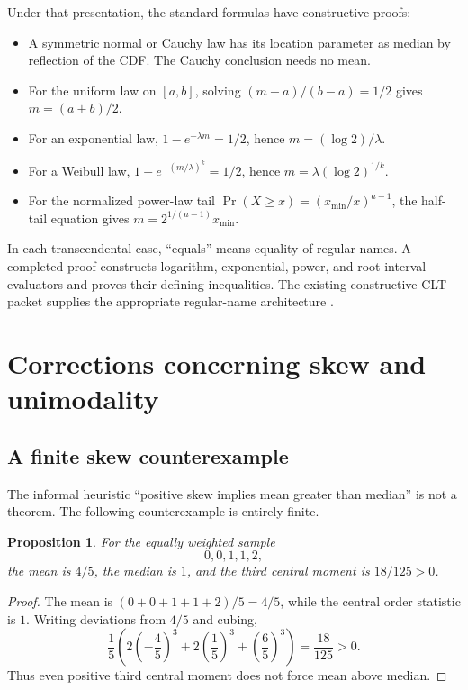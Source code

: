 \documentclass[11pt]{article}
\newtheorem{proposition}[theorem]{Proposition}
\begin{document}
Under that presentation, the standard formulas have constructive proofs:

\begin{itemize}
\item A symmetric normal or Cauchy law has its location parameter as median by
reflection of the CDF.  The Cauchy conclusion needs no mean.
\item For the uniform law on $[a,b]$, solving
$(m-a)/(b-a)=1/2$ gives $m=(a+b)/2$.
\item For an exponential law,
$1-e^{-\lambda m}=1/2$, hence $m=(\log2)/\lambda$.
\item For a Weibull law,
$1-e^{-(m/\lambda)^k}=1/2$, hence
$m=\lambda(\log2)^{1/k}$.
\item For the normalized power-law tail
$\Pr(X\geq x)=(x_{\min}/x)^{a-1}$, the half-tail equation gives
$m=2^{1/(a-1)}x_{\min}$.
\end{itemize}

In each transcendental case, ``equals'' means equality of regular names.  A
completed proof constructs logarithm, exponential, power, and root interval
evaluators and proves their defining inequalities.  The existing constructive
CLT packet supplies the appropriate regular-name architecture
\cite{proveit-clt}.

\section{Corrections concerning skew and unimodality}

\subsection{A finite skew counterexample}

The informal heuristic ``positive skew implies mean greater than median'' is
not a theorem.  The following counterexample is entirely finite.

\begin{proposition}\label{prop:skew-counterexample}
For the equally weighted sample
\[
  0,0,1,1,2,
\]
the mean is $4/5$, the median is $1$, and the third central moment is
$18/125>0$.
\end{proposition}

\begin{proof}
The mean is $(0+0+1+1+2)/5=4/5$, while the central order statistic is $1$.
Writing deviations from $4/5$ and cubing,
\[
 \frac15\left(2\left(-\frac45\right)^3
 +2\left(\frac15\right)^3
 +\left(\frac65\right)^3\right)
 =\frac{18}{125}>0.
\]
Thus even positive third central moment does not force mean above median.
\end{proof}
\end{document}
